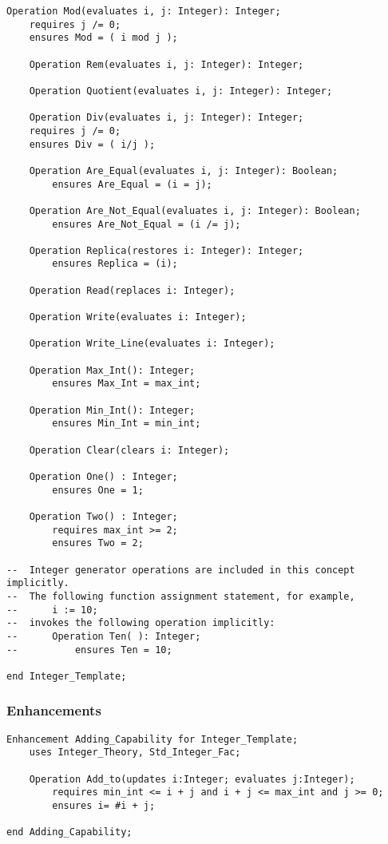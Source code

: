 \begin{lstlisting}[language=resolve]
    Operation Mod(evaluates i, j: Integer): Integer;
	requires j /= 0;
	ensures Mod = ( i mod j );

    Operation Rem(evaluates i, j: Integer): Integer;

    Operation Quotient(evaluates i, j: Integer): Integer;

    Operation Div(evaluates i, j: Integer): Integer;
	requires j /= 0;
	ensures Div = ( i/j );

    Operation Are_Equal(evaluates i, j: Integer): Boolean;
        ensures Are_Equal = (i = j);

    Operation Are_Not_Equal(evaluates i, j: Integer): Boolean;
        ensures Are_Not_Equal = (i /= j);

    Operation Replica(restores i: Integer): Integer;
        ensures Replica = (i);

    Operation Read(replaces i: Integer);

    Operation Write(evaluates i: Integer);

    Operation Write_Line(evaluates i: Integer);

    Operation Max_Int(): Integer;
        ensures Max_Int = max_int;
		
    Operation Min_Int(): Integer;
        ensures Min_Int = min_int;

    Operation Clear(clears i: Integer);

	Operation One() : Integer;
		ensures One = 1;

	Operation Two() : Integer;
		requires max_int >= 2;
		ensures Two = 2;

-- 	Integer generator operations are included in this concept implicitly.
-- 	The following function assignment statement, for example, 
--		i := 10;
-- 	invokes the following operation implicitly:
--    	Operation Ten( ): Integer;
--			ensures Ten = 10;

end Integer_Template;
\end{lstlisting}

		\subsubsection{Enhancements}	%

\begin{lstlisting}[language=resolve]
Enhancement Adding_Capability for Integer_Template;
	uses Integer_Theory, Std_Integer_Fac;

    Operation Add_to(updates i:Integer; evaluates j:Integer);
        requires min_int <= i + j and i + j <= max_int and j >= 0;
        ensures	i= #i + j;

end Adding_Capability;
\end{lstlisting}

